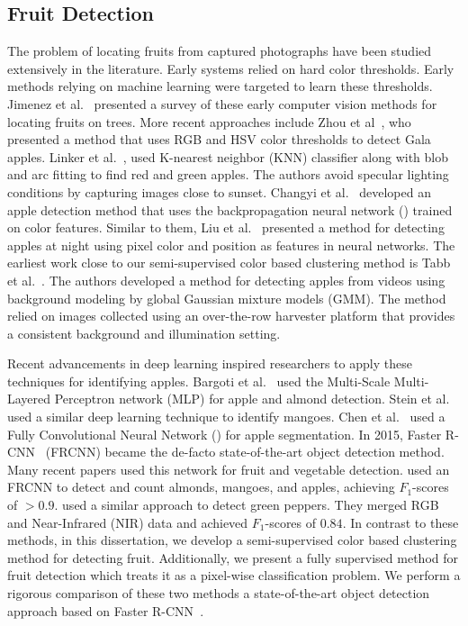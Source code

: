 \subsection{Fruit Detection} The problem of locating fruits from captured photographs have been studied extensively in the literature. Early systems relied on hard color thresholds. Early methods relying on machine learning were targeted to learn these thresholds. Jimenez et al.~\cite{jimenez2000survey} presented a survey of these early computer vision methods for locating fruits on trees. More recent approaches include Zhou et al~\cite{zhouGala}, who presented a method that uses RGB and HSV color thresholds to detect Gala apples. Linker et al.~\cite{Linker}, used K-nearest neighbor (KNN) classifier along with blob and arc fitting to find red and green apples. The authors avoid specular lighting conditions by capturing images close to sunset. Changyi et al.~\cite{changyi2015apple} developed an apple detection method that uses the backpropagation neural network (\cite{hecht1989theory}) trained on color features. Similar to them, Liu et al.~\cite{liu2016method} presented a method for detecting apples at night using pixel color and position as features in neural networks. The earliest work close to our semi-supervised color based clustering method is Tabb et al.~\cite{tabb2006segmentation}. The authors developed a method for detecting apples from videos using background modeling by global Gaussian mixture models (GMM). The method relied on images collected using an over-the-row harvester platform that provides a consistent background and illumination setting. 



Recent advancements in deep learning inspired researchers to apply these techniques for identifying apples. Bargoti et al.~\cite{bargoti2017image} used the Multi-Scale Multi-Layered Perceptron network (MLP) for apple and almond detection. Stein et al.~\cite{stein2016image} used a similar deep learning technique to identify mangoes. Chen et al.~\cite{chen2017counting} used a Fully Convolutional Neural Network (\cite{long2015fully}) for apple segmentation.  In 2015, Faster R-CNN~\cite{ren_faster_2015} (FRCNN) became the de-facto state-of-the-art object detection method.  Many recent papers used this network for fruit and vegetable detection. \cite{bargoti_deep_2017} used an FRCNN to detect and count almonds, mangoes, and apples, achieving $F_1$-scores of $>0.9$. \cite{sa_deepfruits:_2016} used a similar approach to detect green peppers. They merged RGB and Near-Infrared (NIR) data and achieved $F_1$-scores of $0.84$. In contrast to these methods, in this dissertation, we develop a semi-supervised color based clustering method for detecting fruit. Additionally, we present a fully supervised method for fruit detection which treats it as a pixel-wise classification problem. We perform a rigorous comparison of these two methods a state-of-the-art object detection approach based on Faster R-CNN~\cite{bargoti_deep_2017}.

